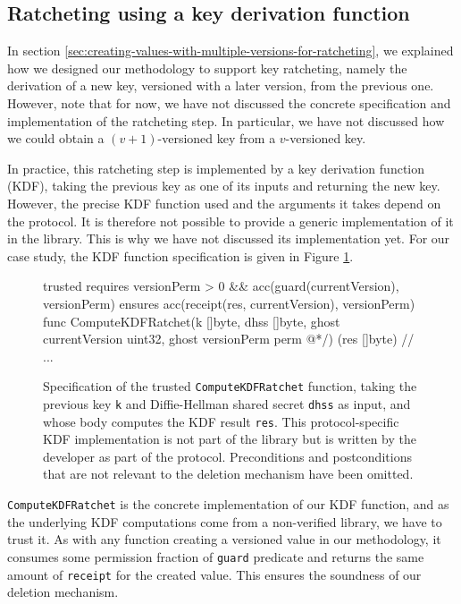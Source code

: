 
\subsection{Ratcheting using a key derivation function}
\label{sec:ratcheting-using-a-key-derivation-function}

In section \ref{sec:creating-values-with-multiple-versions-for-ratcheting}, we explained how we designed our methodology to support key ratcheting, namely the derivation of a new key, versioned with a later version, from the previous one.
However, note that for now, we have not discussed the concrete specification and implementation of the ratcheting step. In particular, we have not discussed how we could obtain a $(v+1)$-versioned key from a $v$-versioned key.

In practice, this ratcheting step is implemented by a key derivation function (KDF), taking the previous key as one of its inputs and returning the new key.
However, the precise KDF function used and the arguments it takes depend on the protocol. It is therefore not possible to provide a generic implementation of it in the library. This is why we have not discussed its implementation yet.
For our case study, the KDF function specification is given in Figure \ref{lst:kdf-ratchet}.

\begin{figure}
    \begin{gobra}
trusted
requires versionPerm > 0 && acc(guard(currentVersion), versionPerm)
ensures  acc(receipt(res, currentVersion), versionPerm)
func ComputeKDFRatchet(k []byte, dhss []byte, ghost currentVersion
    uint32, ghost versionPerm perm @*/) (res []byte) {
    // ...
}
    \end{gobra}
    \caption{Specification of the trusted \texttt{ComputeKDFRatchet} function, taking the previous key \texttt{k} and Diffie-Hellman shared secret \texttt{dhss} as input, and whose body computes the KDF result \texttt{res}. This protocol-specific KDF implementation is not part of the library but is written by the developer as part of the protocol. Preconditions and postconditions that are not relevant to the deletion mechanism have been omitted.}
    \label{lst:kdf-ratchet}
\end{figure}

\texttt{ComputeKDFRatchet} is the concrete implementation of our KDF function, and as the underlying KDF computations come from a non-verified library, we have to trust it.
As with any function creating a versioned value in our methodology, it consumes some permission fraction of \texttt{guard} predicate and returns the same amount of \texttt{receipt} for the created value. This ensures the soundness of our deletion mechanism.

